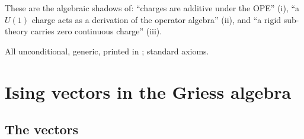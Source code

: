 \begin{physics}
These are the algebraic shadows of: ``charges are additive under the OPE'' (i), ``a $U(1)$ charge acts as a
derivation of the operator algebra'' (ii), and ``a rigid sub-theory carries zero continuous charge'' (iii).
\end{physics}
\begin{status}
All unconditional, generic, printed in ; standard axioms.
\end{status}

\section{Ising vectors in the Griess algebra}\label{ch20:sec:ising}

\subsection{The vectors}


